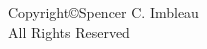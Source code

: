 \vspace*{\fill}
\begin{center}
    Copyright\copyright Spencer C. Imbleau \the\year{}\\
    All Rights Reserved
\end{center}
\vspace*{\fill}
\clearpage
